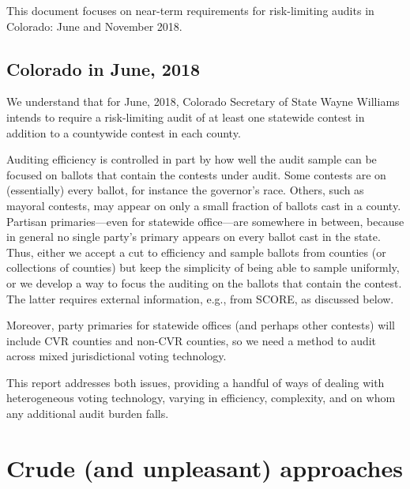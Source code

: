 \documentclass[12pt]{article}
\begin{document}
This document focuses on near-term requirements for risk-limiting audits in 
Colorado: June and November 2018.

\subsection{Colorado in June, 2018}
We understand that for June, 2018, Colorado Secretary of State Wayne Williams intends to require
a risk-limiting audit of at least one statewide contest in addition
to a countywide contest in each county.

Auditing efficiency is controlled in part by how well the audit sample can be focused on ballots that
contain the contests under audit.
Some contests are on (essentially) every ballot, for instance the governor's race.
Others, such as mayoral contests, may appear on only a small fraction of ballots cast in
a county.
Partisan primaries---even for statewide office---are somewhere in between,
because in general no single party's primary appears on every ballot cast in the state.
Thus, either we accept a cut to efficiency and sample ballots from counties (or collections of counties)
but keep the simplicity of being able to sample uniformly, or we develop a way to
focus the auditing on the ballots that contain the contest.
The latter requires external information, e.g., from SCORE, as discussed below.

Moreover, party primaries for statewide offices (and perhaps other contests) will
include CVR counties and non-CVR counties, so we need a method to audit
across mixed jurisdictional voting technology.

This report addresses both issues, providing a handful of ways of dealing with heterogeneous
voting technology, varying in efficiency, complexity, and on whom any additional audit burden falls.

\section{Crude (and unpleasant) approaches}
\end{document}
